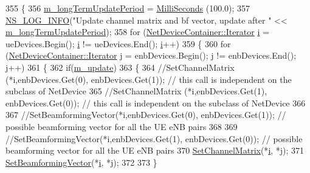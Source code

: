 \begin{DoxyCode}
355 \{
356         \hyperlink{classns3_1_1MmWaveBeamforming_acdc1c52dae96b7e5b73a235f381e39f0}{m\_longTermUpdatePeriod} = \hyperlink{group__timecivil_gaf26127cf4571146b83a92ee18679c7a9}{MilliSeconds} (100.0);
357         \hyperlink{group__logging_gafbd73ee2cf9f26b319f49086d8e860fb}{NS\_LOG\_INFO}(\textcolor{stringliteral}{"Update channel matrix and bf vector, update after "} << 
      \hyperlink{classns3_1_1MmWaveBeamforming_acdc1c52dae96b7e5b73a235f381e39f0}{m\_longTermUpdatePeriod});
358         \textcolor{keywordflow}{for} (\hyperlink{classns3_1_1NetDeviceContainer_a45709bb572f975569ed985fa89b132f8}{NetDeviceContainer::Iterator} \hyperlink{bernuolliDistribution_8m_a6f6ccfcf58b31cb6412107d9d5281426}{i} = ueDevices.Begin(); 
      \hyperlink{bernuolliDistribution_8m_a6f6ccfcf58b31cb6412107d9d5281426}{i} != ueDevices.End(); \hyperlink{bernuolliDistribution_8m_a6f6ccfcf58b31cb6412107d9d5281426}{i}++)
359         \{
360                 \textcolor{keywordflow}{for} (\hyperlink{classns3_1_1NetDeviceContainer_a45709bb572f975569ed985fa89b132f8}{NetDeviceContainer::Iterator} j = enbDevices.Begin(); j != 
      enbDevices.End(); j++)
361                 \{
362                         \textcolor{keywordflow}{if}(\hyperlink{classns3_1_1MmWaveBeamforming_abb587108615acddd1438879730658dad}{m\_update})
363                         \{
364                                 \textcolor{comment}{//SetChannelMatrix (*i,enbDevices.Get(0), enbDevices.Get(1)); // this call
       is independent on the subclass of NetDevice}
365                                 \textcolor{comment}{//SetChannelMatrix (*i,enbDevices.Get(1), enbDevices.Get(0)); // this call
       is independent on the subclass of NetDevice}
366 
367                                 \textcolor{comment}{//SetBeamformingVector(*i,enbDevices.Get(0), enbDevices.Get(1)); //
       possible beamforming vector for all the UE eNB pairs}
368 
369                                 \textcolor{comment}{//SetBeamformingVector(*i,enbDevices.Get(1), enbDevices.Get(0)); //
       possible beamforming vector for all the UE eNB pairs}
370                                 \hyperlink{classns3_1_1MmWaveBeamforming_a16438840f78c78b12d3507f223deb40f}{SetChannelMatrix}(*\hyperlink{bernuolliDistribution_8m_a6f6ccfcf58b31cb6412107d9d5281426}{i}, *j);
371                                 \hyperlink{classns3_1_1MmWaveBeamforming_aa0d212530a3bb0552438281f01a7fd81}{SetBeamformingVector}(*\hyperlink{bernuolliDistribution_8m_a6f6ccfcf58b31cb6412107d9d5281426}{i}, *j);
372 
373                         \}

\end{DoxyCode}
